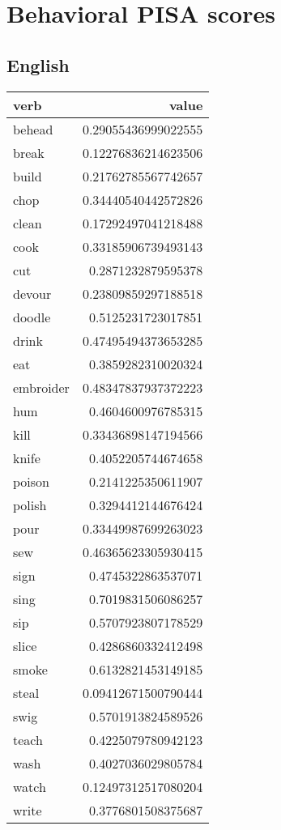 \section{Behavioral PISA scores} 

\subsection{English}

\begin{longtable}{l|r}
\textbf{verb}     & \textbf{value}    \\
\hline
\endhead
behead    & 0.29055436999022555 \\
break     & 0.12276836214623506 \\
build     & 0.21762785567742657 \\
chop      & 0.34440540442572826 \\
clean     & 0.17292497041218488 \\
cook      & 0.33185906739493143 \\
cut       & 0.2871232879595378  \\
devour    & 0.23809859297188518 \\
doodle    & 0.5125231723017851  \\
drink     & 0.47495494373653285 \\
eat       & 0.3859282310020324  \\
embroider & 0.48347837937372223 \\
hum       & 0.4604600976785315  \\
kill      & 0.33436898147194566 \\
knife     & 0.4052205744674658  \\
poison    & 0.2141225350611907  \\
polish    & 0.3294412144676424  \\
pour      & 0.33449987699263023 \\
sew       & 0.46365623305930415 \\
sign      & 0.4745322863537071  \\
sing      & 0.7019831506086257  \\
sip       & 0.5707923807178529  \\
slice     & 0.4286860332412498  \\
smoke     & 0.6132821453149185  \\
steal     & 0.09412671500790444 \\
swig      & 0.5701913824589526  \\
teach     & 0.4225079780942123  \\
wash      & 0.4027036029805784  \\
watch     & 0.12497312517080204 \\
write     & 0.3776801508375687 
\end{longtable}


